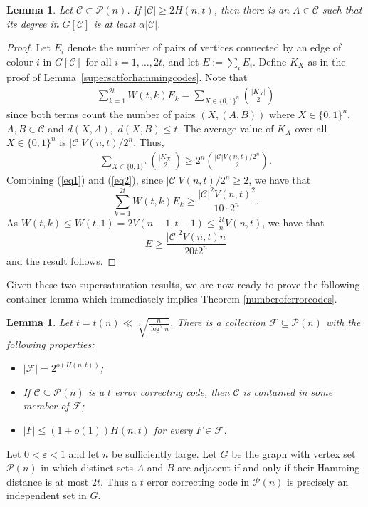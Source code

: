 \documentclass[11pt]{article}
\newtheorem{lemma}[theorem]{Lemma}
\numberwithin{equation}{section}
\def\P{\mathcal{P}}
\def\eps{\varepsilon}
\begin{document}
\begin{lemma}\label{generalcodeserrorsupersat}
Let $\mathcal{C}\subset \mathcal{P}(n)$. If $|\mathcal{C}|\geq 2H(n,t)$, then there is an $A\in\mathcal{C}$ such that its degree in $G[\mathcal{C}]$ is at least $\alpha |\mathcal{C}|$.
\end{lemma}
\begin{proof}
Let $E_i$ denote the number of pairs of vertices connected by an edge of colour $i$ in $G[\mathcal{C}]$ for all $i=1,\dots ,2t$, and let $E:=\sum _i E_i$.
Define $K_X$  as in the proof of Lemma~\ref{supersatforhammingcodes}. Note that
\begin{align}\label{eq1}
\sum_{k=1}^{2t}W(t,k)E_k = \sum_{X\in\{0,1\}^n}\binom{|K_X|}{2}
\end{align}
since both terms count the number of pairs $(X,(A,B))$ where $X \in \{0,1\}^n$, $A,B \in \mathcal C$ and $d(X,A),$ $ d(X,B) \leq t$.
The average value of $K_X$ over all $X \in \{0,1\}^n$ is $|\mathcal C|V(n,t)/2^n$. Thus,
\begin{align}\label{eq2}
 \sum_{X\in\{0,1\}^n}\binom{|K_X|}{2} \geq 2^n \binom{|\mathcal{C}|V(n,t)/2^n}{2}.
\end{align}
Combining (\ref{eq1}) and (\ref{eq2}), 
 since $|\mathcal{C}|V(n,t)/2^n\geq 2$, we have that  $$\sum_{k=1}^{2t}W(t,k)E_k\geq \frac{|\mathcal{C}|^2 V(n,t)^2}{10\cdot 2^n}.$$
As $W(t,k)\leq W(t,1)= 2V(n-1,t-1)\leq \frac{2t}{n}V(n,t)$, we have that $$E\geq\frac{|\mathcal{C}|^2 V(n,t)n}{20t  2^n}$$ and the result follows.
\end{proof}


Given these two supersaturation results, we are now ready to prove the following container lemma which immediately implies Theorem \ref{numberoferrorcodes}. 


\begin{lemma}\label{hammingcont} Let $t=t(n)\ll \sqrt[3]{\frac{ n}{\log^2 n}}$. There is a collection $\mathcal F \subseteq \P(n)$ with the following properties:
\begin{itemize}
\item[(i)]  $|\mathcal F|=2^{o(H(n,t))}$;
\item[(ii)] If $\mathcal C \subseteq \P(n)$ is a $t$ error correcting code, then $\mathcal C$ is contained in some member of $\mathcal F$;
\item[(iii)] $|F|\leq (1+o(1))H(n,t)$ for every $F \in \mathcal F$.
\end{itemize}
\end{lemma}
\proof
Let $0< \eps <1$ and let $n$ be sufficiently large. Let $G$ be the graph with vertex set $\P(n)$ in which distinct sets $A$ and $B$ are adjacent if and only if their Hamming distance is at most $2t$. Thus a $t$ error correcting code in $\P(n)$ is precisely an independent set in $G$. 
\end{document}

